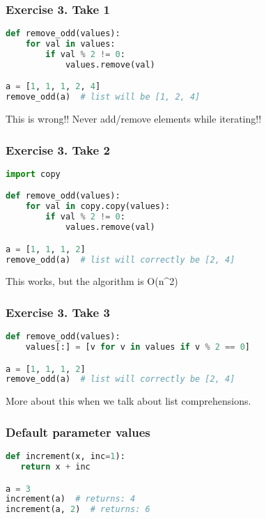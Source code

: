 \documentclass{beamer}
\begin{document}
\begin{frame}[fragile]
\frametitle{Exercise 3. Take 1}

\begin{lstlisting}[language=python]
def remove_odd(values):
    for val in values:
        if val % 2 != 0:
            values.remove(val)

a = [1, 1, 1, 2, 4]
remove_odd(a)  # list will be [1, 2, 4]
\end{lstlisting}
\vspace{5 mm}
This is wrong!! Never add/remove elements while iterating!!
\end{frame}

\begin{frame}[fragile]
\frametitle{Exercise 3. Take 2}
\begin{lstlisting}[language=python]
import copy

def remove_odd(values):
    for val in copy.copy(values):
        if val % 2 != 0:
            values.remove(val)

a = [1, 1, 1, 2]
remove_odd(a)  # list will correctly be [2, 4]
\end{lstlisting}
\vspace{5 mm}
This works, but the algorithm is O(n^2)
\end{frame}


\begin{frame}[fragile]
\frametitle{Exercise 3. Take 3}
\begin{lstlisting}[language=python]
def remove_odd(values):
    values[:] = [v for v in values if v % 2 == 0]

a = [1, 1, 1, 2]
remove_odd(a)  # list will correctly be [2, 4]
\end{lstlisting}
\vspace{5 mm}
More about this when we talk about list comprehensions.
\end{frame}


\begin{frame}[fragile]
\frametitle{Default parameter values}

\begin{lstlisting}[language=python]
def increment(x, inc=1):
   return x + inc

a = 3
increment(a)  # returns: 4
increment(a, 2)  # returns: 6
\end{lstlisting}
\end{frame}
\end{document}
